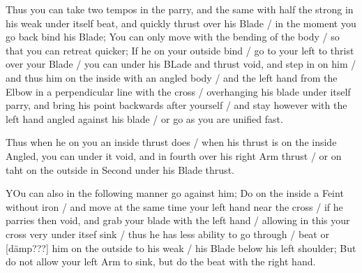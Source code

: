 
Thus you can take two tempos in the parry, and the same with half the
strong in his weak under itself beat, and quickly thrust over his
Blade / in the moment you go back bind his Blade; You can only move with
the bending of the body / so that you can retreat quicker; If he on
your outside bind / go to your left to thrist over your Blade / you
can under his BLade and thrust void, and step in on him / and thus him
on the inside with an angled body / and the left hand from the Elbow
in a perpendicular line with the cross / overhanging his blade under
itself parry, and bring his point backwards after yourself / and stay
however with the left hand angled against his blade / or go as you are
unified fast.


Thus when he on you an inside thrust does / when his thrust is on the
inside Angled, you can under it void, and in fourth over his right Arm
thrust / or on taht on the outside in Second under his Blade thrust.


YOu can also in the following manner go against him; Do on the inside
a Feint without iron / and move at the same time your left hand near
the cross / if he parries then void, and grab your blade with the left
hand / allowing in this your cross very under itsef sink / thus he has
less ability to go through / beat or [dämp???] him on the outside to his weak / his Blade
below his left shoulder; But do not allow your left Arm to sink, but
do the beat with the right hand.